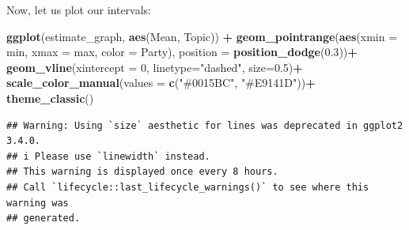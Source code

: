 \documentclass[
]{book}
\newenvironment{Shaded}{\begin{snugshade}}{\end{snugshade}}
\newcommand{\AttributeTok}[1]{\textcolor[rgb]{0.13,0.29,0.53}{#1}}
\newcommand{\DecValTok}[1]{\textcolor[rgb]{0.00,0.00,0.81}{#1}}
\newcommand{\FloatTok}[1]{\textcolor[rgb]{0.00,0.00,0.81}{#1}}
\newcommand{\FunctionTok}[1]{\textcolor[rgb]{0.13,0.29,0.53}{\textbf{#1}}}
\newcommand{\NormalTok}[1]{#1}
\newcommand{\OtherTok}[1]{\textcolor[rgb]{0.56,0.35,0.01}{#1}}
\newcommand{\SpecialCharTok}[1]{\textcolor[rgb]{0.81,0.36,0.00}{\textbf{#1}}}
\newcommand{\StringTok}[1]{\textcolor[rgb]{0.31,0.60,0.02}{#1}}
\begin{document}
\begin{Shaded}
\end{Shaded}

Now, let us plot our intervals:

\begin{Shaded}
\begin{Highlighting}[]
\FunctionTok{ggplot}\NormalTok{(estimate\_graph, }\FunctionTok{aes}\NormalTok{(Mean, Topic)) }\SpecialCharTok{+}
 \FunctionTok{geom\_pointrange}\NormalTok{(}\FunctionTok{aes}\NormalTok{(}\AttributeTok{xmin =}\NormalTok{ min, }\AttributeTok{xmax =}\NormalTok{ max, }\AttributeTok{color =}\NormalTok{ Party),}
                 \AttributeTok{position =} \FunctionTok{position\_dodge}\NormalTok{(}\FloatTok{0.3}\NormalTok{))}\SpecialCharTok{+}
 \FunctionTok{geom\_vline}\NormalTok{(}\AttributeTok{xintercept =} \DecValTok{0}\NormalTok{,}
            \AttributeTok{linetype=}\StringTok{"dashed"}\NormalTok{, }\AttributeTok{size=}\FloatTok{0.5}\NormalTok{)}\SpecialCharTok{+}
 \FunctionTok{scale\_color\_manual}\NormalTok{(}\AttributeTok{values =} \FunctionTok{c}\NormalTok{(}\StringTok{"\#0015BC"}\NormalTok{, }\StringTok{"\#E9141D"}\NormalTok{))}\SpecialCharTok{+}
 \FunctionTok{theme\_classic}\NormalTok{()}
\end{Highlighting}
\end{Shaded}

\begin{verbatim}
## Warning: Using `size` aesthetic for lines was deprecated in ggplot2 3.4.0.
## i Please use `linewidth` instead.
## This warning is displayed once every 8 hours.
## Call `lifecycle::last_lifecycle_warnings()` to see where this warning was
## generated.
\end{verbatim}
\end{document}
